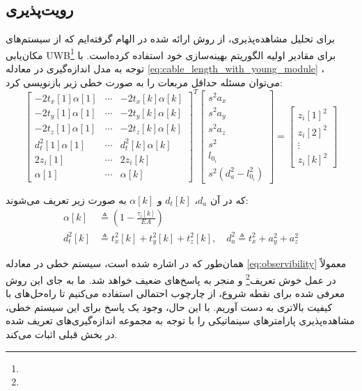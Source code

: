 \subsection{رویت‌پذیری}
برای تحلیل مشاهده‌پذیری، از روش ارائه شده در
\cite{blueml2021bias}
الهام گرفته‌ایم که از سیستم‌های مکان‌یابی  UWB\footnote{}
برای مقادیر اولیه الگوریتم بهینه‌سازی خود استفاده کرده‌است. با توجه به مدل اندازه‌گیری در معادله
\ref{eq:cable_length_with_young_module}
، می‌توان مسئله حداقل مربعات را به صورت خطی زیر بازنویسی کرد:
\begin{equation}\label{eq:observibility}
	\begin{bmatrix}
		-2t_x[1]\alpha[1] & \cdots & -2t_x[k]\alpha[k] \\
		-2t_y[1]\alpha[1] & \cdots & -2t_y[k]\alpha[k] \\
		-2t_z[1]\alpha[1] & \cdots & -2t_z[k]\alpha[k] \\
		d^2_t[1]\alpha[1] & \cdots & d^2_t[k]\alpha[k] \\
		2z_i[1] & \cdots & 2z_i[k] \\
		\alpha[1] & \cdots & \alpha[k]
	\end{bmatrix}^T
	\begin{bmatrix}
		s^2 a_x \\
		s^2 a_y \\
		s^2 a_z \\
		s^2 \\
		l_{0_i} \\
		s^2 (d^2_a - l_{0_i}^2)
	\end{bmatrix}
	=
	\begin{bmatrix}
		z_i[1]^2 \\
		z_i[2]^2 \\
		\vdots \\
		z_i[k]^2
	\end{bmatrix}
\end{equation}

که در آن \( d_a \)، \( d_t[k] \) و \( \alpha[k] \) به صورت زیر تعریف می‌شوند:
\begin{equation}
	\begin{split}
		\alpha[k] &\triangleq \left(1 - \frac{\tau_i[k]}{EA}\right) \\
		d^2_t[k] &\triangleq t^2_x[k] + t^2_y[k] + t^2_z[k], \quad d^2_a \triangleq t^2_x + a^2_y + a^2_z
	\end{split}
\end{equation}

همان‌طور که در 
\cite{blueml2021bias}
اشاره شده است، سیستم خطی در معادله 
\ref{eq:observibility}
معمولاً در عمل خوش تعریف\footnote{}
و منجر به پاسخ‌های ضعیف خواهد شد. ما به جای این روش معرفی شده برای نقطه شروع، از چارچوب احتمالی استفاده می‌کنیم تا راه‌حل‌های با کیفیت بالاتری به دست آوریم. با این حال، وجود یک پاسخ برای این سیستم خطی، مشاهده‌پذیری پارامترهای سینماتیکی را با توجه به مجموعه اندازه‌گیری‌های تعریف شده در بخش قبلی اثبات می‌کند.









